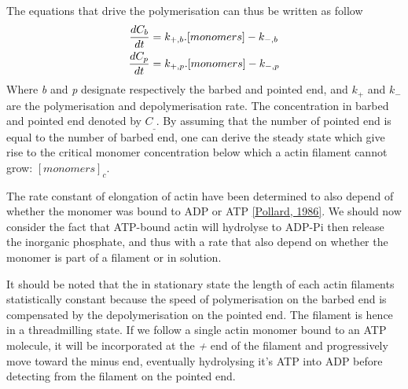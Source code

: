 \documentclass[A4paperpaper,11pt,english]{sphinxmanual}
\begin{document}
The equations that drive the polymerisation can thus be written as follow
\begin{gather}
\begin{split}\frac{dC_b}{dt} &= k_{+,b}.[monomers] - k_{-,b} \\
\frac{dC_p}{dt} &= k_{+,p}.[monomers] - k_{-,p} \\\end{split}\notag
\end{gather}
Where \emph{b} and \emph{p} designate respectively the barbed and pointed end, and
\(k_+\) and \(k_-\) are the polymerisation and depolymerisation rate.
The concentration in barbed and pointed end denoted by \(C_\_\). By
assuming that the number of pointed end is equal to the number of barbed end,
one can derive the steady state which give rise to the critical monomer
concentration below which a actin filament cannot grow: \([monomers]_c\).

The rate constant of elongation of actin have been determined to also depend of
whether the monomer was bound to ADP or ATP {\hyperref[bibitem:pollard1986]{{[}Pollard,  1986{]}}}. We should now
consider the fact that ATP-bound actin will hydrolyse to ADP-Pi then release
the inorganic phosphate, and thus with a rate that also depend on whether the
monomer is part of a filament or in solution.

It should be noted that the in stationary state the length of each actin
filaments statistically constant because the speed of polymerisation on the
barbed end is compensated by the depolymerisation on the pointed end. The
filament is hence in a threadmilling state. If we follow a single actin monomer
bound to an ATP molecule, it will be incorporated at the \emph{+} end of the
filament and progressively move toward the minus end, eventually hydrolysing
it's ATP into ADP before detecting from the filament on the pointed end.
\end{document}
